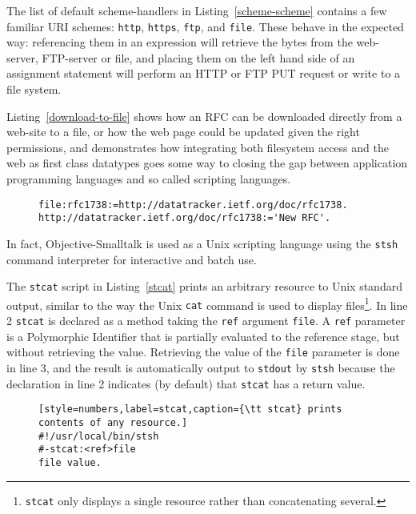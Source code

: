 \documentclass[preprint,authoryear]{llncs}
\begin{document}
The list of default scheme-handlers in Listing~\ref{scheme-scheme} contains a few familiar URI schemes:
{\tt http}, {\tt https}, {\tt ftp}, and {\tt file}.   These behave in the expected way:   referencing them in an expression will
retrieve the bytes from the web-server, FTP-server or file, and placing them on the left hand side of
an assignment statement will perform an HTTP or FTP PUT request or write to a file system. 
 
Listing~\ref{download-to-file} shows how an RFC can be downloaded directly from a web-site
to a file, or how the web page could be updated given the right permissions, and demonstrates how integrating both filesystem access and the web as first class datatypes
goes some way to closing the gap between application programming languages and so called
scripting languages.

\begin{figure}[htbp]
\begin{lstlisting}[style=numbers,label=download-to-file,caption=Downloading an RFC to a file.]
file:rfc1738:=http://datatracker.ietf.org/doc/rfc1738.
http://datatracker.ietf.org/doc/rfc1738:='New RFC'.
\end{lstlisting}
\end{figure}

In fact,  Objective-Smalltalk is used as a Unix scripting language using the {\tt stsh} command
interpreter for interactive and batch use.  

The {\tt stcat} script in Listing~\ref{stcat} prints an arbitrary resource to Unix standard output, 
similar to the way the Unix {\tt cat} command is used to display files\footnote{{\tt stcat} only 
displays a single resource rather than concatenating several.}.
In line 2  {\tt stcat} is declared as a method taking the {\tt ref} argument {\tt file}.
A {\tt ref} parameter is a Polymorphic Identifier that is partially evaluated to the reference stage,
but without retrieving the value.  Retrieving the value of the {\tt file} parameter is done in line 3,
and the result is automatically output to {\tt stdout} by {\tt stsh} because the declaration in line
2 indicates (by default) that {\tt stcat} has a return value.

\begin{figure}[htbp]
\begin{lstlisting}[style=numbers,label=stcat,caption={\tt stcat} prints contents of any resource.]
#!/usr/local/bin/stsh
#-stcat:<ref>file
file value.
\end{lstlisting}
\end{figure}
\end{document}

